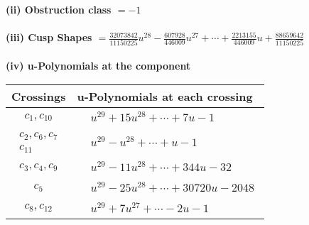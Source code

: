 \documentclass[1p]{elsarticle_modified}
\theoremstyle{definition}
\begin{document}
\flushleft \textbf{(ii) Obstruction class $= -1$}\\~\\
\flushleft \textbf{(iii) Cusp Shapes $= \frac{32073842}{11150225} u^{28}-\frac{607928}{446009} u^{27}+\cdots+\frac{2213155}{446009} u+\frac{88659642}{11150225}$}\\~\\
\newpage\renewcommand{\arraystretch}{1}
\flushleft \textbf{(iv) u-Polynomials at the component}\newline \\
\begin{tabular}{m{50pt}|m{274pt}}
Crossings & \hspace{64pt}u-Polynomials at each crossing \\
\hline $$\begin{aligned}c_{1},c_{10}\end{aligned}$$&$\begin{aligned}
&u^{29}+15 u^{28}+\cdots+7 u-1
\end{aligned}$\\
\hline $$\begin{aligned}c_{2},c_{6},c_{7}\\c_{11}\end{aligned}$$&$\begin{aligned}
&u^{29}- u^{28}+\cdots+u-1
\end{aligned}$\\
\hline $$\begin{aligned}c_{3},c_{4},c_{9}\end{aligned}$$&$\begin{aligned}
&u^{29}-11 u^{28}+\cdots+344 u-32
\end{aligned}$\\
\hline $$\begin{aligned}c_{5}\end{aligned}$$&$\begin{aligned}
&u^{29}-25 u^{28}+\cdots+30720 u-2048
\end{aligned}$\\
\hline $$\begin{aligned}c_{8},c_{12}\end{aligned}$$&$\begin{aligned}
&u^{29}+7 u^{27}+\cdots-2 u-1
\end{aligned}$\\
\hline
\end{tabular}\\~\\
\newpage\renewcommand{\arraystretch}{1}
\end{document}
